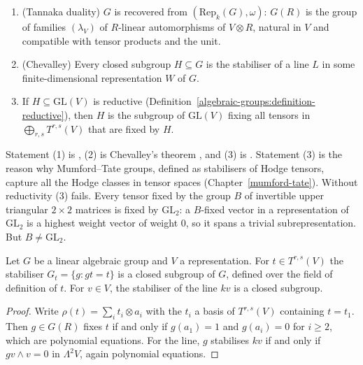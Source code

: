 \begin{theorem}\label{algebraic-groups:theorem-tannakian}
\begin{enumerate}
\item (Tannaka duality) $G$ is recovered from $(\mathrm{Rep}_k(G), \omega)$: $G(R)$ is the group of families $(\lambda_V)$ of $R$-linear automorphisms of $V \otimes R$,
natural in $V$ and compatible with tensor products and the unit.
\item (Chevalley) Every closed subgroup $H \subseteq G$ is the stabiliser of a line $L$ in some finite-dimensional representation $W$ of $G$.
\item If $H \subseteq \mathrm{GL}(V)$ is reductive (Definition~\ref{algebraic-groups:definition-reductive}), then $H$ is the subgroup of $\mathrm{GL}(V)$ fixing all tensors in
$\bigoplus_{r,s}T^{r,s}(V)$ that are fixed by $H$.
\end{enumerate}
\end{theorem}

Statement (1) is \cite[Theorem 2.11]{deligne-milne}, (2) is Chevalley's theorem \cite{milne-algebraic-groups}, and (3) is
\cite[Proposition 3.1(c)]{deligne-abelian}. Statement (3) is the reason why Mumford--Tate groups, defined as stabilisers of Hodge tensors, capture all the Hodge classes in
tensor spaces (Chapter~\ref{mumford-tate}). Without reductivity (3) fails. Every tensor fixed by the group $B$ of invertible upper triangular $2 \times 2$ matrices is fixed by
$\mathrm{GL}_2$: a $B$-fixed vector in a representation of $\mathrm{GL}_2$ is a highest weight vector of weight $0$, so it spans a trivial subrepresentation. But $B \neq \mathrm{GL}_2$.

\begin{proposition}\label{algebraic-groups:proposition-subgroup-fixing}
Let $G$ be a linear algebraic group and $V$ a representation. For $t \in T^{r,s}(V)$ the stabiliser $G_t = \{g : gt = t\}$ is a closed subgroup of $G$, defined over the
field of definition of $t$. For $v \in V$, the stabiliser of the line $kv$ is a closed subgroup.
\end{proposition}

\begin{proof}
Write $\rho(t) = \sum_it_i \otimes a_i$ with the $t_i$ a basis of $T^{r,s}(V)$ containing $t = t_1$. Then $g \in G(R)$ fixes $t$ if and only if $g(a_1) = 1$ and $g(a_i) = 0$ for $i \geq 2$,
which are polynomial equations. For the line, $g$ stabilises $kv$ if and only if $gv \wedge v = 0$ in $\Lambda^2V$, again polynomial equations.
\end{proof}

